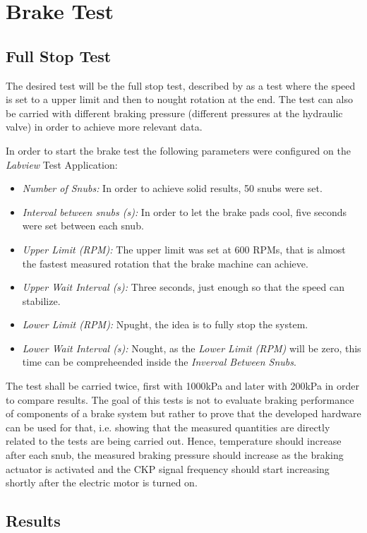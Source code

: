 \section{Brake Test}\label{sec:brakeTest}

	\subsection{Full Stop Test}

	The desired test will be the full stop test, described by \cite{caixeta2017} as a test where the speed is set to a upper limit and then to nought rotation at the end. The test can also be carried with different braking pressure (different pressures at the hydraulic valve) in order to achieve more relevant data.

	\par
	In order to start the brake test the following parameters were configured on the \textit{Labview} Test Application:

	\begin{itemize}
		\item\textit{Number of Snubs:} In order to achieve solid results, 50 snubs were set.
		\item\textit{Interval between snubs (s):} In order to let the brake pads cool, five seconds were set between each snub.
		\item\textit{Upper Limit (RPM):} The upper limit was set at 600 RPMs, that is almost the fastest measured rotation that the brake machine can achieve.
		\item\textit{Upper Wait Interval (s):} Three seconds, just enough so that the speed can stabilize.
		\item\textit{Lower Limit (RPM):} Npught, the idea is to fully stop the system.
		\item\textit{Lower Wait Interval (s):} Nought, as the \textit{Lower Limit (RPM)} will be zero, this time can be compreheended inside the \textit{Inverval Between Snubs}.
	\end{itemize}

	The test shall be carried twice, first with 1000kPa and later with 200kPa in order to compare results. The goal of this tests is not to evaluate braking performance of components of a brake system but rather to prove that the developed hardware can be used for that, i.e. showing that the measured quantities are directly related to the tests are being carried out. Hence, temperature should increase after each snub, the measured braking pressure should increase as the braking actuator is activated and the CKP signal frequency should start increasing shortly after the electric motor is turned on.

	\subsection{Results}

